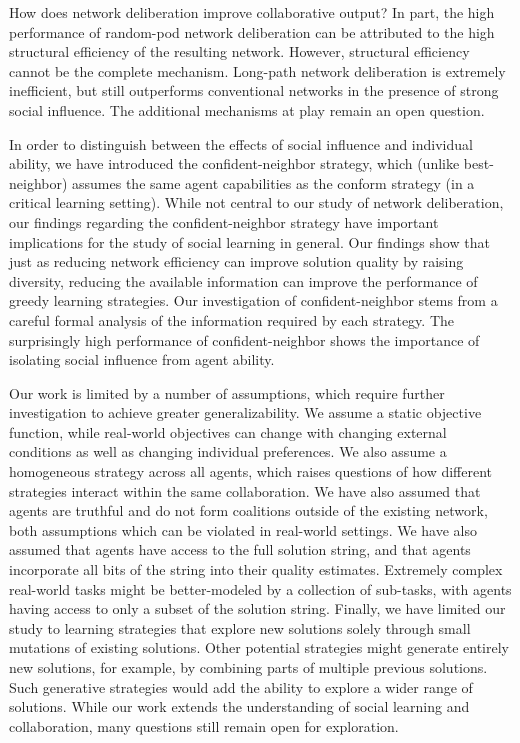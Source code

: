 How does network deliberation improve collaborative output? In part, the high performance of random-pod network deliberation can be attributed to the high structural efficiency of the resulting network. However, structural efficiency cannot be the complete mechanism. Long-path network deliberation is extremely inefficient, but still outperforms conventional networks in the presence of strong social influence. The additional mechanisms at play remain an open question.

In order to distinguish between the effects of social influence and individual ability, we have introduced the confident-neighbor strategy, which (unlike best-neighbor) assumes the same agent capabilities as the conform strategy (in a critical learning setting).
While not central to our study of network deliberation, our findings regarding the 
confident-neighbor strategy have important implications for the study of social learning in general. 
Our findings show that just as reducing network efficiency can improve solution quality by raising diversity, reducing the available information can improve the performance of greedy learning strategies. Our investigation of confident-neighbor stems from a careful formal analysis of the information required by each strategy. The surprisingly high performance of confident-neighbor shows the importance of isolating social influence from agent ability.

Our work is limited by a number of assumptions, which require further investigation to achieve greater generalizability. We assume a static objective function, while real-world objectives can change with changing external conditions as well as changing individual preferences. We also assume a homogeneous strategy across all agents, which raises questions of how different strategies interact within the same collaboration. We have also assumed that agents are truthful and do not form coalitions outside of the existing network, both assumptions which can be violated in real-world settings.
We have also assumed that agents have access to the full solution string, and that agents incorporate all bits of the string into their quality estimates. Extremely complex real-world tasks might be better-modeled by a collection of sub-tasks, with agents having access to only a subset of the solution string.
Finally, we have limited our study to learning strategies that explore new solutions solely through small mutations of existing solutions. Other potential strategies might generate entirely new solutions, for example, by combining parts of multiple previous solutions. Such generative strategies would add the ability to explore a wider range of solutions. While our work extends the understanding of social learning and collaboration, many questions still remain open for exploration.

